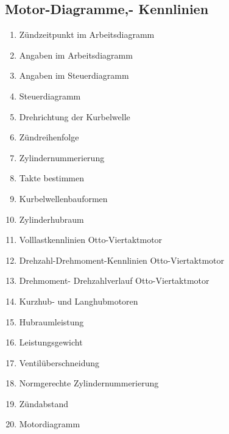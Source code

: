 \subsection{Motor-Diagramme,-
Kennlinien}\label{motor-diagramme--kennlinien}

\begin{enumerate}
\item
  Zündzeitpunkt im Arbeitsdiagramm\\
\item
  Angaben im Arbeitsdiagramm\\
\item
  Angaben im Steuerdiagramm\\
\item
  Steuerdiagramm\\
\item
  Drehrichtung der Kurbelwelle\\
\item
  Zündreihenfolge\\
\item
  Zylindernummerierung\\
\item
  Takte bestimmen\\
\item
  Kurbelwellenbauformen\\
\item
  Zylinderhubraum\\
\item
  Volllastkennlinien Otto-Viertaktmotor\\
\item
  Drehzahl-Drehmoment-Kennlinien Otto-Viertaktmotor\\
\item
  Drehmoment- Drehzahlverlauf Otto-Viertaktmotor\\
\item
  Kurzhub- und Langhubmotoren\\
\item
  Hubraumleistung\\
\item
  Leistungsgewicht\\
\item
  Ventilüberschneidung\\
\item
  Normgerechte Zylindernummerierung\\
\item
  Zündabstand\\
\item
  Motordiagramm
\end{enumerate}

